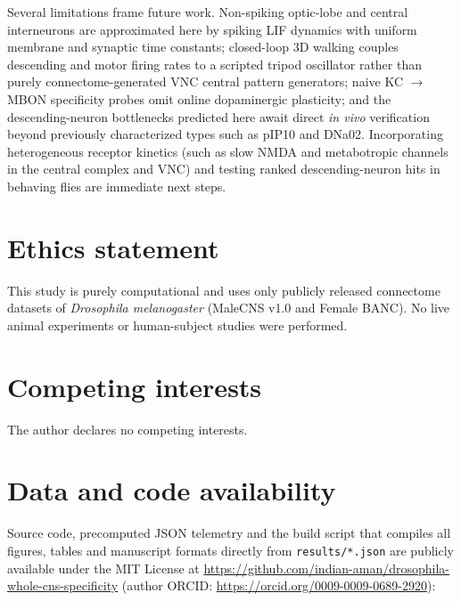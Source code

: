 \documentclass[11pt,a4paper]{article}
\begin{document}
Several limitations frame future work. Non-spiking optic-lobe and central interneurons are approximated here by spiking LIF dynamics with uniform membrane and synaptic time constants; closed-loop 3D walking couples descending and motor firing rates to a scripted tripod oscillator rather than purely connectome-generated VNC central pattern generators; naive KC $\rightarrow$ MBON specificity probes omit online dopaminergic plasticity; and the descending-neuron bottlenecks predicted here await direct \emph{in vivo} verification beyond previously characterized types such as pIP10 and DNa02. Incorporating heterogeneous receptor kinetics (such as slow NMDA and metabotropic channels in the central complex and VNC) and testing ranked descending-neuron hits in behaving flies are immediate next steps.

\section*{Ethics statement}
This study is purely computational and uses only publicly released connectome datasets of \emph{Drosophila melanogaster} (MaleCNS v1.0 and Female BANC). No live animal experiments or human-subject studies were performed.

\section*{Competing interests}
The author declares no competing interests.

\section*{Data and code availability}
Source code, precomputed JSON telemetry and the build script that compiles all figures, tables and manuscript formats directly from \texttt{results/*.json} are publicly available under the MIT License at \url{https://github.com/indian-aman/drosophila-whole-cns-specificity} (author ORCID: \url{https://orcid.org/0009-0009-0689-2920}):
\end{document}
